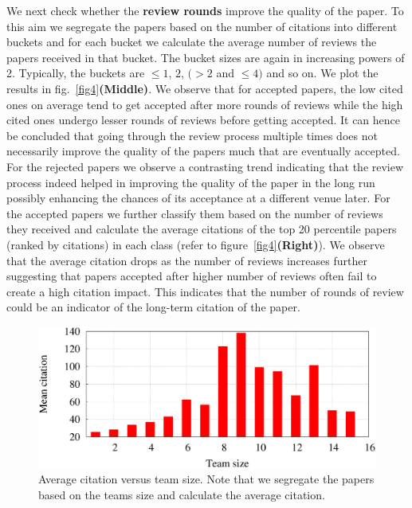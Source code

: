 We next check whether the {\bf review rounds} improve the quality of the paper. To this aim we segregate the papers based on the number of citations into different buckets and for each bucket we calculate the average number of reviews the papers received in that bucket. The bucket sizes are again in increasing powers of 2. Typically, the buckets are $\leq 1$, $2$, $(>2$ and $\leq 4)$ and so on. We plot the results in fig.~\ref{fig4}{\bf (Middle)}. We observe that for accepted papers, the low cited ones on average tend to get accepted after more rounds of reviews while the high cited ones undergo lesser rounds of reviews before getting accepted. It can hence be concluded that going through the review process multiple times does not necessarily improve the quality of the papers much that are eventually accepted. For the rejected papers we observe a contrasting trend indicating that the review process indeed helped in improving the quality of the paper in the long run possibly enhancing the chances of its acceptance at a different venue later. For the accepted papers we further classify them based on the number of reviews they received and calculate the average citations of the top 20 percentile papers (ranked by citations) in each class (refer to figure~\ref{fig4}{\bf (Right)}). We observe that the average citation drops as the number of reviews increases further suggesting that papers accepted after higher number of reviews often fail to create a high citation impact. This indicates that the number of rounds of review could be an indicator of the long-term citation of the paper. 

\begin{figure}
\centering
\includegraphics[scale  = 0.25]{./texfiles/Chapter_4/jcdl/figures/team_citation}
\caption{\label{team:citation} Average citation versus team size. Note that we segregate the papers based on the teams size and calculate the average citation.}
\end{figure}


